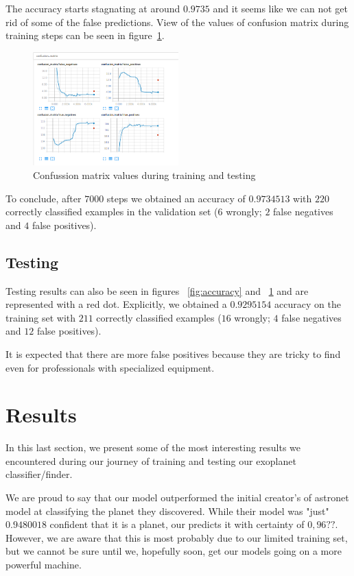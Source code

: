 \documentclass[twoside]{article}
\begin{document}
\begin{multicols}{2}
The accuracy starts stagnating at around $0.9735$ and it seems like we can not get rid of some of the false predictions. View of the values of confusion matrix during training steps can be seen in figure~\ref{fig:confmat}.
\begin{figure}[H]
\includegraphics[width=0.5\textwidth]{train-test_cm}
\caption{Confussion matrix values during training and testing}
\label{fig:confmat}
\end{figure}

To conclude, after $7000$ steps we obtained an accuracy of $0.9734513$ with $220$ correctly classified examples in the validation set ($6$ wrongly; $2$ false negatives and $4$ false positives).

\subsection{Testing}
Testing results can also be seen in figures ~\ref{fig:accuracy} and ~\ref{fig:confmat} and are represented with a red dot. Explicitly, we obtained a $0.9295154$ accuracy on the training set with $211$ correctly classified examples ($16$ wrongly; $4$ false negatives and $12$ false positives).

It is expected that there are more false positives because they are tricky to find even for professionals with specialized equipment.


\section{Results}
In this last section, we present some of the most interesting results we encountered during our journey of training and testing our exoplanet classifier/finder.

We are proud to say that our model outperformed the initial creator's of astronet model at classifying the planet they discovered. While their model was "just" $0.9480018$ confident that it is a planet, our predicts it with certainty of $0,96??$. However, we are aware that this is most probably due to our limited training set, but we cannot be sure until we, hopefully soon, get our models going on a more powerful machine.


\end{multicols}
\end{document}
